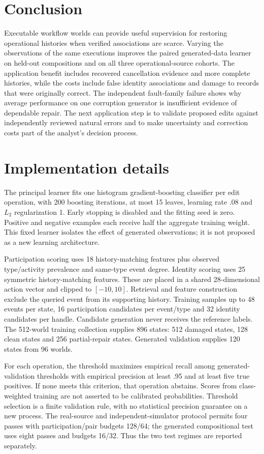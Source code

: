 \documentclass[11pt]{article}
\begin{document}
\section{Conclusion}
Executable workflow worlds can provide useful supervision for restoring operational histories when verified associations are scarce. Varying the observations of the same executions improves the paired generated-data learner on held-out compositions and on all three operational-source cohorts. The application benefit includes recovered cancellation evidence and more complete histories, while the costs include false identity associations and damage to records that were originally correct. The independent fault-family failure shows why average performance on one corruption generator is insufficient evidence of dependable repair. The next application step is to validate proposed edits against independently reviewed natural errors and to make uncertainty and correction costs part of the analyst's decision process.

\appendix
\section{Implementation details}
The principal learner fits one histogram gradient-boosting classifier per edit operation, with 200 boosting iterations, at most 15 leaves, learning rate .08 and $L_2$ regularization 1. Early stopping is disabled and the fitting seed is zero. Positive and negative examples each receive half the aggregate training weight. This fixed learner isolates the effect of generated observations; it is not proposed as a new learning architecture.

Participation scoring uses 18 history-matching features plus observed type/activity prevalence and same-type event degree. Identity scoring uses 25 symmetric history-matching features. These are placed in a shared 28-dimensional action vector and clipped to $[-10,10]$. Retrieval and feature construction exclude the queried event from its supporting history. Training samples up to 48 events per state, 16 participation candidates per event/type and 32 identity candidates per handle. Candidate generation never receives the reference labels. The 512-world training collection supplies 896 states: 512 damaged states, 128 clean states and 256 partial-repair states. Generated validation supplies 120 states from 96 worlds.

For each operation, the threshold maximizes empirical recall among generated-validation thresholds with empirical precision at least .95 and at least five true positives. If none meets this criterion, that operation abstains. Scores from class-weighted training are not asserted to be calibrated probabilities. Threshold selection is a finite validation rule, with no statistical precision guarantee on a new process. The real-source and independent-simulator protocol permits four passes with participation/pair budgets 128/64; the generated compositional test uses eight passes and budgets 16/32. Thus the two test regimes are reported separately.
\end{document}
